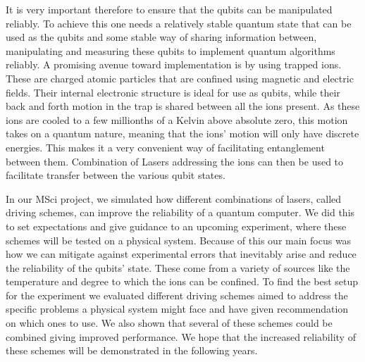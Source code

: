 \documentclass[12pt,twoside]{report}
\begin{document}
{It is very important therefore to ensure that the qubits can be manipulated reliably. To achieve this one needs a relatively stable quantum state that can be used as the qubits and some stable way of sharing information between, manipulating and measuring these qubits to implement quantum algorithms reliably. A promising avenue toward implementation is by using trapped ions. These are charged atomic particles that are confined using magnetic and electric fields. Their internal electronic structure is ideal for use as qubits, while their back and forth motion in the trap is shared between all the ions present. As these ions are cooled to a few millionths of a Kelvin above absolute zero, this motion takes on a quantum nature, meaning that the ions' motion will only have discrete energies. This makes it a very convenient way of facilitating entanglement between them. Combination of Lasers addressing the ions can then be used to facilitate transfer between the various qubit states.

In our MSci project, we simulated how different combinations of lasers, called driving schemes, can improve the reliability of a quantum computer. We did this to set expectations and give guidance to an upcoming experiment, where these schemes will be tested on a physical system. Because of this our main focus was how we can mitigate against experimental errors that inevitably arise and reduce the reliability of the qubits' state. These come from a variety of sources like the temperature and degree to which the ions can be confined. To find the best setup for the experiment we evaluated different driving schemes aimed to address the specific problems a physical system might face and have given recommendation on which ones to use. We also shown that several of these schemes could be combined giving improved performance. We hope that the increased reliability of these schemes will be demonstrated in the following years.%
}
\vspace*{\fill}

\newpage
\end{document}
